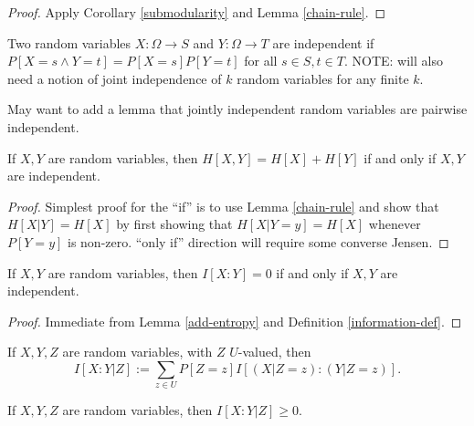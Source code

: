 \begin{proof}   Apply Corollary \ref{submodularity} and Lemma \ref{chain-rule}.
\end{proof}

\begin{definition}\label{independent-def}
Two random variables $X: \Omega \to S$ and $Y: \Omega \to T$ are independent if $P[ X = s \wedge Y = t] = P[X=s] P[Y=t]$ for all $s \in S, t \in T$.  NOTE: will also need a notion of joint independence of $k$ random variables for any finite $k$.
\end{definition}

May want to add a lemma that jointly independent random variables are pairwise independent.

\begin{lemma}\label{add-entropy}  If $X,Y$ are random variables, then $H[X,Y] = H[X] + H[Y]$ if and only if $X,Y$ are independent.
\end{lemma}

\begin{proof}  Simplest proof for the ``if'' is to use Lemma \ref{chain-rule} and show that $H[X|Y] = H[X]$ by first showing that $H[X|Y=y] = H[X]$ whenever $P[Y=y]$ is non-zero.  ``only if'' direction will require some converse Jensen.
\end{proof}


\begin{corollary}\label{vanish-entropy}  If $X,Y$ are random variables, then $I[X:Y] = 0$ if and only if $X,Y$ are independent.
\end{corollary}

\begin{proof}  Immediate from Lemma \ref{add-entropy} and Definition \ref{information-def}.
\end{proof}

\begin{definition}\label{conditional-mutual-def}  If $X,Y,Z$ are random variables, with $Z$ $U$-valued, then
  $$ I[X:Y|Z] := \sum_{z \in U} P[Z=z] I[(X|Z=z): (Y|Z=z)].$$
\end{definition}

\begin{lemma}\label{conditional-nonneg}  
If $X,Y,Z$ are random variables, then $I[X:Y|Z] \ge 0$.
\end{lemma}

